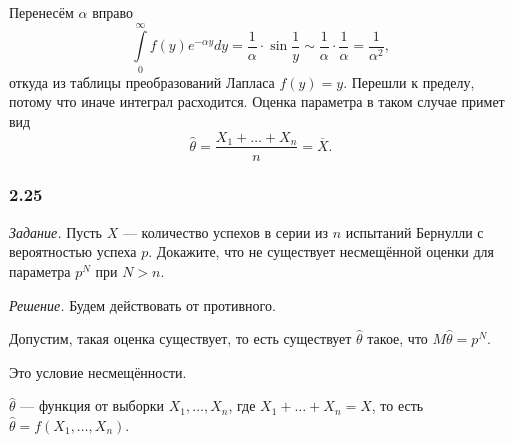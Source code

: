 Перенесём $ \alpha $ вправо
$$ \int \limits_0^{ \infty } f \left( y \right) e^{- \alpha y} dy =
  \frac{1}{ \alpha } \cdot \sin \frac{1}{y} \sim
  \frac{1}{ \alpha } \cdot \frac{1}{ \alpha } =
  \frac{1}{ \alpha^2},$$
откуда из таблицы преобразований Лапласа $f \left( y \right) = y$.
Перешли к пределу, потому что иначе интеграл расходится.
Оценка параметра в таком случае примет вид
$$ \hat{ \theta } =
  \frac{X_1 + \dotsc + X_n}{n} =
  \overline{X}.$$

\subsubsection*{2.25}

\textit{Задание.}
Пусть $X$ --- количество успехов в серии из $n$ испытаний Бернулли с вероятностью успеха $p$.
Докажите, что не существует несмещённой оценки для параметра $p^N$ при $N > n$.

\textit{Решение.} Будем действовать от противного.

Допустим, такая оценка существует, то есть существует $ \hat{ \theta }$ такое,
что $M \hat{ \theta } = p^N$.

Это условие несмещённости.

$ \hat{ \theta }$ --- функция от выборки $X_1, \dotsc, X_n$, где $X_1 + \dotsc + X_n = X$,
то есть $ \hat{ \theta } = f \left( X_1, \dotsc, X_n \right) $.

